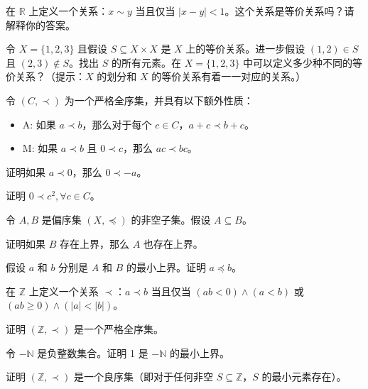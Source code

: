\begin{problemset}
    \item 在 $\mathbb{R}$ 上定义一个关系：$x \sim y$ 当且仅当 $|x - y| < 1$。这个关系是等价关系吗？请解释你的答案。

    \item 令 $X = \{1, 2, 3\}$ 且假设 $S \subseteq X \times X$ 是 $X$ 上的等价关系。进一步假设 $(1, 2) \in S$ 且 $(2, 3) \notin S$。找出 $S$ 的所有元素。在 $X = \{1, 2, 3\}$ 中可以定义多少种不同的等价关系？（提示：$X$ 的划分和 $X$ 的等价关系有着一一对应的关系。）

    \item 令 $(C, \prec)$ 为一个严格全序集，并具有以下额外性质：
    \begin{itemize}
        \item A: 如果 $a \prec b$，那么对于每个 $c \in C$，$a + c \prec b + c$。
        \item M: 如果 $a \prec b$ 且 $0 \prec c$，那么 $ac \prec bc$。
    \end{itemize}
    \begin{probenumerate}
        \item 证明如果 $a \prec 0$，那么 $0 \prec -a$。
        \item 证明 $0 \prec c^2, \forall c \in C$。
    \end{probenumerate}

    \item 令 $A, B$ 是偏序集 $(X, \preceq)$ 的非空子集。假设 $A \subseteq B$。
    \begin{probenumerate}
        \item 证明如果 $B$ 存在上界，那么 $A$ 也存在上界。
        \item 假设 $a$ 和 $b$ 分别是 $A$ 和 $B$ 的最小上界。证明 $a \preceq b$。
    \end{probenumerate}

    \item 在 $\mathbb{Z}$ 上定义一个关系 $\prec$：$a \prec b$ 当且仅当 $(ab < 0) \wedge (a < b)$ 或 $(ab \geq 0) \wedge (|a| < |b|)$。
    \begin{probenumerate}
        \item 证明 $(\mathbb{Z}, \prec)$ 是一个严格全序集。
        \item 令 $-\mathbb{N}$ 是负整数集合。证明 1 是 $-\mathbb{N}$ 的最小上界。
        \item 证明 $(\mathbb{Z}, \prec)$ 是一个良序集（即对于任何非空 $S \subseteq \mathbb{Z}$，$S$ 的最小元素存在）。
    \end{probenumerate}
\end{problemset}
